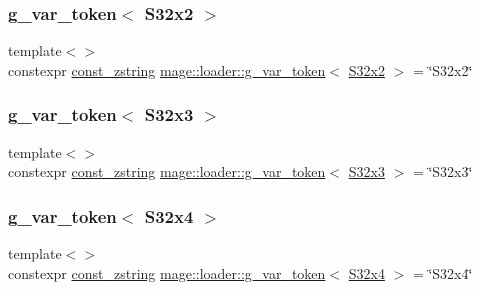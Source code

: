 \mbox{\label{namespacemage_1_1loader_a47ee1a5bab16e86d014a3e203e6f117a}} 
\subsubsection{\texorpdfstring{g\+\_\+var\+\_\+token$<$ S32x2 $>$}{g\_var\_token< S32x2 >}}
{\footnotesize\ttfamily template$<$$>$ \\
constexpr \mbox{\hyperlink{namespacemage_abfd9206dc607ceb5d13ec68bf075a5c0}{const\+\_\+zstring}} \mbox{\hyperlink{namespacemage_1_1loader_af955278eb72ed57ce15bc79d4d074b3a}{mage\+::loader\+::g\+\_\+var\+\_\+token}}$<$ \mbox{\hyperlink{namespacemage_aad06aca0b442d3b41653eafed822d571}{S32x2}} $>$ = \char`\"{}S32x2\char`\"{}}

\mbox{\label{namespacemage_1_1loader_aa6d75fe62fb95231a21055e829a99cac}} 
\subsubsection{\texorpdfstring{g\+\_\+var\+\_\+token$<$ S32x3 $>$}{g\_var\_token< S32x3 >}}
{\footnotesize\ttfamily template$<$$>$ \\
constexpr \mbox{\hyperlink{namespacemage_abfd9206dc607ceb5d13ec68bf075a5c0}{const\+\_\+zstring}} \mbox{\hyperlink{namespacemage_1_1loader_af955278eb72ed57ce15bc79d4d074b3a}{mage\+::loader\+::g\+\_\+var\+\_\+token}}$<$ \mbox{\hyperlink{namespacemage_afda77adce1ca6e842614d915b5073284}{S32x3}} $>$ = \char`\"{}S32x3\char`\"{}}

\mbox{\label{namespacemage_1_1loader_ad6fee44f06cd254cbde79f39e27baf93}} 
\subsubsection{\texorpdfstring{g\+\_\+var\+\_\+token$<$ S32x4 $>$}{g\_var\_token< S32x4 >}}
{\footnotesize\ttfamily template$<$$>$ \\
constexpr \mbox{\hyperlink{namespacemage_abfd9206dc607ceb5d13ec68bf075a5c0}{const\+\_\+zstring}} \mbox{\hyperlink{namespacemage_1_1loader_af955278eb72ed57ce15bc79d4d074b3a}{mage\+::loader\+::g\+\_\+var\+\_\+token}}$<$ \mbox{\hyperlink{namespacemage_a2b6e779e11cdeafb812f067a0682af15}{S32x4}} $>$ = \char`\"{}S32x4\char`\"{}}

